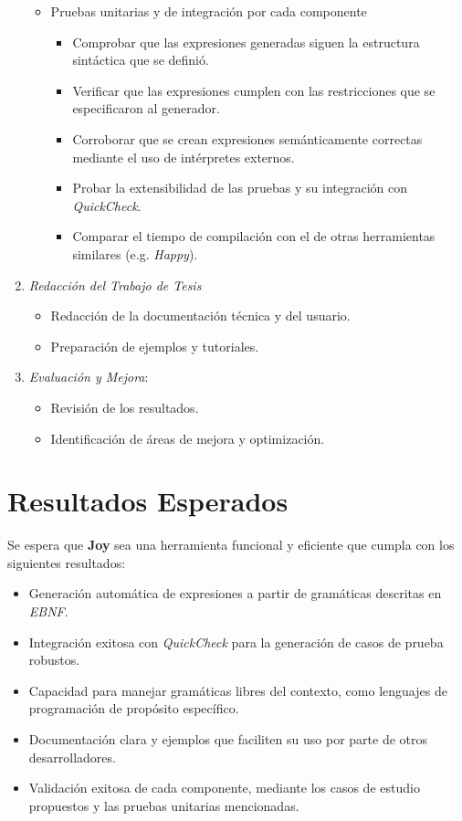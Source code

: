 \documentclass[11pt]{article}
\begin{document}
\begin{enumerate}
\begin{itemize}
  \item Pruebas unitarias y de integración por cada componente

    \begin{itemize}
    \item Comprobar que las expresiones generadas siguen la estructura sintáctica que se definió.
    \item Verificar que las expresiones cumplen con las restricciones que se especificaron al generador.
    \item Corroborar que se crean expresiones semánticamente correctas mediante el uso de intérpretes externos.
      
    \item Probar la extensibilidad de las pruebas y su integración con \textit{QuickCheck}.

    \item Comparar el tiempo de compilación con el de otras herramientas similares (e.g. \textit{Happy}).
    \end{itemize}
  \end{itemize}
\item \textit{Redacción del Trabajo de Tesis}
  
  \begin{itemize}
  \item Redacción de la documentación técnica y del usuario.
  \item Preparación de ejemplos y tutoriales.
  \end{itemize}

\item \textit{Evaluación y Mejora}:

  \begin{itemize}
  \item Revisión de los resultados.
  \item Identificación de áreas de mejora y optimización.
  \end{itemize}
\end{enumerate}

\section*{Resultados Esperados}

Se espera que \textbf{Joy} sea una herramienta funcional y eficiente que cumpla con los siguientes resultados:

\begin{itemize}
\item Generación automática de expresiones a partir de gramáticas descritas en \textit{EBNF}.
\item Integración exitosa con \textit{QuickCheck} para la generación de casos de prueba robustos.
\item Capacidad para manejar gramáticas libres del contexto, como lenguajes de programación de propósito específico.
\item Documentación clara y ejemplos que faciliten su uso por parte de otros desarrolladores.
\item Validación exitosa de cada componente, mediante los casos de estudio propuestos y las pruebas unitarias mencionadas.
\end{itemize}
\end{document}
